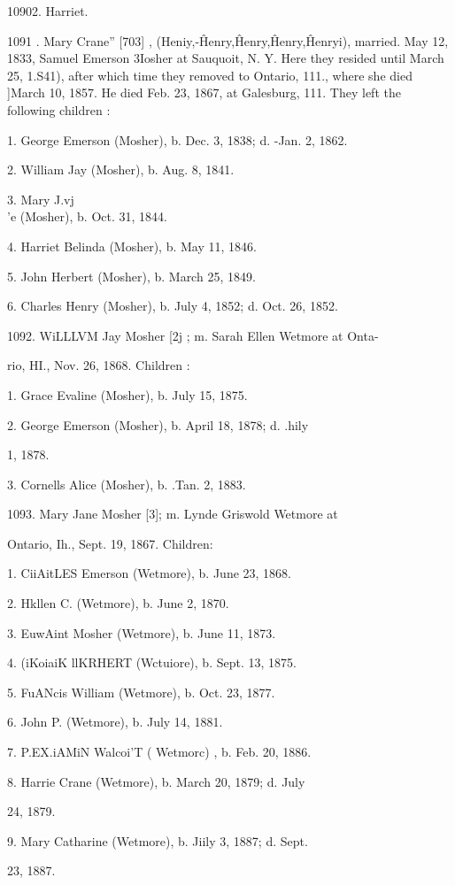 \documentclass{book}
\begin{document}
10902. Harriet. 

1091 . Mary Crane'' [703] , (Heniy,-\^ Henry,\^ Henry,\^ Henry,\^ 
Henryi), married. May 12, 1833, Samuel Emerson 3Iosher at 
Sauquoit, N. Y. Here they resided until March 25, 1.S41), after 
which time they removed to Ontario, 111., where she died ]March 
10, 1857. He died Feb. 23, 1867, at Galesburg, 111. They left 
the following children : 

1. George Emerson (Mosher), b. Dec. 3, 1838; d. -Jan. 2, 1862. 

2. William Jay (Mosher), b. Aug. 8, 1841. 

3. Mary J.vj\\'e (Mosher), b. Oct. 31, 1844. 

4. Harriet Belinda (Mosher), b. May 11, 1846. 

5. John Herbert (Mosher), b. March 25, 1849. 

6. Charles Henry (Mosher), b. July 4, 1852; d. Oct. 26, 1852. 

1092. WiLLLVM Jay Mosher [2j ; m. Sarah Ellen Wetmore at Onta- 

rio, HI., Nov. 26, 1868. Children : 

1. Grace Evaline (Mosher), b. July 15, 1875. 

2. George Emerson (Mosher), b. April 18, 1878; d. .hily 

1, 1878. 

3. Cornells Alice (Mosher), b. .Tan. 2, 1883. 

1093. Mary Jane Mosher [3]; m. Lynde Griswold Wetmore at 

Ontario, Ih., Sept. 19, 1867. Children: 

1. CiiAitLES Emerson (Wetmore), b. June 23, 1868. 

2. Hkllen C. (Wetmore), b. June 2, 1870. 

3. EuwAint Mosher (Wetmore), b. June 11, 1873. 

4. (iKoiaiK llKRHERT (Wctuiore), b. Sept. 13, 1875. 

5. FuANcis William (Wetmore), b. Oct. 23, 1877. 

6. John P. (Wetmore), b. July 14, 1881. 

7. P.EX.iAMiN Walcoi'T ( Wetmorc) , b. Feb. 20, 1886. 

8. Harrie Crane (Wetmore), b. March 20, 1879; d. July 

24, 1879. 

9. Mary Catharine (Wetmore), b. Jiily 3, 1887; d. Sept. 

23, 1887. 
\end{document}
